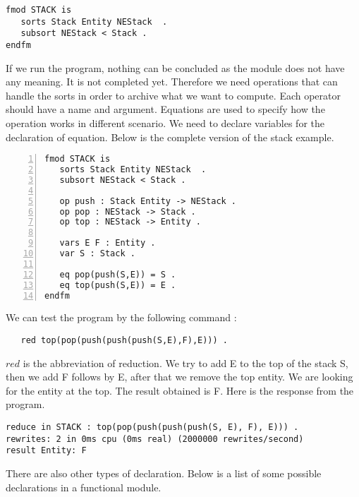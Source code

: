 \documentclass{report}
\begin{document}
\begin{verbatim}
fmod STACK is
   sorts Stack Entity NEStack  .
   subsort NEStack < Stack .
endfm
\end{verbatim}
If we run the program, nothing can be concluded as the module does not have any meaning. It is not completed yet. Therefore we need operations that can handle the sorts in order to archive what we want to compute. Each operator should have a name and argument. Equations are used to specify how the operation works in different scenario. We need to declare variables for the declaration of equation. Below is the complete version of the stack example.
\newline 
\begin{lstlisting}[numbers=left, frame=lines, xleftmargin=5.0ex]
fmod STACK is
   sorts Stack Entity NEStack  .
   subsort NEStack < Stack .

   op push : Stack Entity -> NEStack .
   op pop : NEStack -> Stack .
   op top : NEStack -> Entity .

   vars E F : Entity .
   var S : Stack .

   eq pop(push(S,E)) = S . 
   eq top(push(S,E)) = E .   
endfm
\end{lstlisting}
\vspace{0.2cm}
We can test the program by the following command :
\begin{verbatim}
   red top(pop(push(push(push(S,E),F),E))) . \end{verbatim}
$red $ is the abbreviation of reduction. We try to add E to the top of the stack S, then we add F follows by E, after that we remove the top entity. We are looking for the entity at the top. The result obtained is F. Here is the response from the program.
\newline 
\begin{lstlisting}[frame=single,linewidth=13.4cm]
reduce in STACK : top(pop(push(push(push(S, E), F), E))) .
rewrites: 2 in 0ms cpu (0ms real) (2000000 rewrites/second)
result Entity: F 
\end{lstlisting}

There are also other types of declaration. Below is a list of some possible declarations in a functional module.
\end{document}
